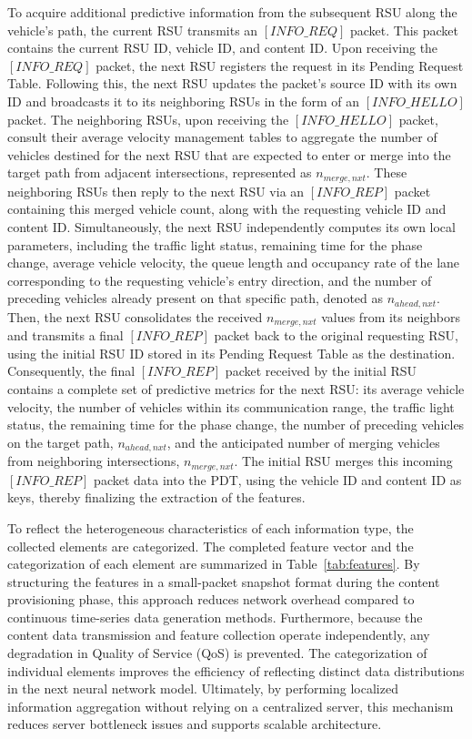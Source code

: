 \documentclass[journal]{IEEEtran}
\begin{document}
To acquire additional predictive information from the subsequent RSU along the vehicle's path, the current RSU transmits an \([INFO\_REQ]\) packet. This packet contains the current RSU ID, vehicle ID, and content ID. Upon receiving the \([INFO\_REQ]\) packet, the next RSU registers the request in its Pending Request Table. Following this, the next RSU updates the packet's source ID with its own ID and broadcasts it to its neighboring RSUs in the form of an \([INFO\_HELLO]\) packet. The neighboring RSUs, upon receiving the \([INFO\_HELLO]\) packet, consult their average velocity management tables to aggregate the number of vehicles destined for the next RSU that are expected to enter or merge into the target path from adjacent intersections, represented as $n_{merge,nxt}$. These neighboring RSUs then reply to the next RSU via an \([INFO\_REP]\) packet containing this merged vehicle count, along with the requesting vehicle ID and content ID. Simultaneously, the next RSU independently computes its own local parameters, including the traffic light status, remaining time for the phase change, average vehicle velocity, the queue length and occupancy rate of the lane corresponding to the requesting vehicle's entry direction, and the number of preceding vehicles already present on that specific path, denoted as $n_{ahead,nxt}$. Then, the next RSU consolidates the received $n_{merge,nxt}$ values from its neighbors and transmits a final \([INFO\_REP]\) packet back to the original requesting RSU, using the initial RSU ID stored in its Pending Request Table as the destination. Consequently, the final \([INFO\_REP]\) packet received by the initial RSU contains a complete set of predictive metrics for the next RSU: its average vehicle velocity, the number of vehicles within its communication range, the traffic light status, the remaining time for the phase change, the number of preceding vehicles on the target path, $n_{ahead,nxt}$, and the anticipated number of merging vehicles from neighboring intersections, $n_{merge,nxt}$. The initial RSU merges this incoming \([INFO\_REP]\) packet data into the PDT, using the vehicle ID and content ID as keys, thereby finalizing the extraction of the features.

To reflect the heterogeneous characteristics of each information type, the collected elements are categorized. The completed feature vector and the categorization of each element are summarized in Table~\ref{tab:features}. By structuring the features in a small-packet snapshot format during the content provisioning phase, this approach reduces network overhead compared to continuous time-series data generation methods. Furthermore, because the content data transmission and feature collection operate independently, any degradation in Quality of Service (QoS) is prevented. The categorization of individual elements improves the efficiency of reflecting distinct data distributions in the next neural network model. Ultimately, by performing localized information aggregation without relying on a centralized server, this mechanism reduces server bottleneck issues and supports scalable architecture.
\end{document}
